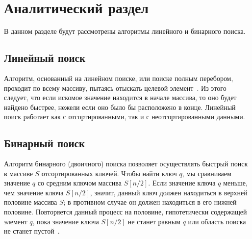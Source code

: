 \chapter{Аналитический раздел}

В данном разделе будут рассмотрены алгоритмы линейного и бинарного поиска.

\section{Линейный поиск}

Алгоритм, основанный на линейном поиске, или поиске полным перебором, проходит по всему массиву, пытаясь отыскать целевой элемент~\cite{stivens}. Из этого следует, что если искомое значение находится в начале массива, то оно будет найдено быстрее, нежели если оно было бы расположено в конце. Линейный поиск работает как с отсортированными, так и с неотсортированными данными.

\section{Бинарный поиск}

Алгоритм бинарного (двоичного) поиска позволяет осуществлять быстрый поиск в массиве $S$ отсортированных ключей. Чтобы найти ключ $q$, мы сравниваем значение $q$ со средним
ключом массива $S[n/2]$. Если значение ключа $q$ меньше, чем значение ключа $S[n/2]$,
значит, данный ключ должен находиться в верхней половине массива $S$; в противном
случае он должен находиться в его нижней половине. Повторяется данный процесс на половине, гипотетически содержащей элемент $q$, пока значение ключа $S[n/2]$ не станет равным $q$ или область поиска не станет пустой~\cite{skiena}.

